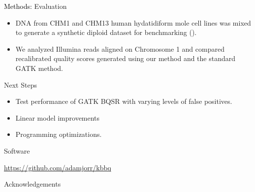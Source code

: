 \documentclass{beamer}
\begin{document}
\begin{frame}{}
\begin{columns}[T]
\begin{column}[T]{.5\linewidth}



\begin{block}{\textcolor{black}{Methods:} Evaluation}
\begin{itemize}
	\item DNA from CHM1 and CHM13 human hydatidiform mole cell lines was mixed to generate a synthetic diploid dataset for benchmarking (\cite{li_syndip}).
	\item We analyzed Illumina reads aligned on Chromosome 1 and compared recalibrated quality scores generated using our method and the standard GATK method.
\end{itemize}
\end{block}


\begin{block}{Next Steps}
\begin{itemize}
	\item Test performance of GATK BQSR with varying levels of false positives.
	\item Linear model improvements
	\item Programming optimizations.
\end{itemize}
\end{block}


\begin{block}{Software}

 \url{https://github.com/adamjorr/kbbq}

\end{block}

\begin{block}{Acknowledgements}



\end{block}
\end{column}
\end{columns}
\end{frame}
\end{document}
